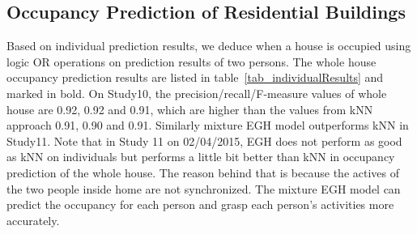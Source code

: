 \subsection{Occupancy Prediction of Residential Buildings}
Based on individual prediction results, we deduce when a house is occupied
using logic OR operations on prediction results of two persons. 
The whole house occupancy prediction results are listed in 
table~\ref{tab_individualResults} and marked in bold. 
On Study10, the precision/recall/F-measure values of whole house are 0.92, 0.92 and 0.91, 
which are higher than the values from kNN approach 0.91, 0.90 and 0.91. Similarly mixture EGH model outperforms kNN in Study11. 
Note that in Study 11 on 02/04/2015, 
EGH does not perform as good as kNN on individuals
but performs a little bit better than kNN in occupancy prediction of the whole house. 
The reason behind that is because the actives of the two people inside home 
are not synchronized. The mixture EGH model can predict the 
occupancy for each person and grasp each person's activities more accurately. 

